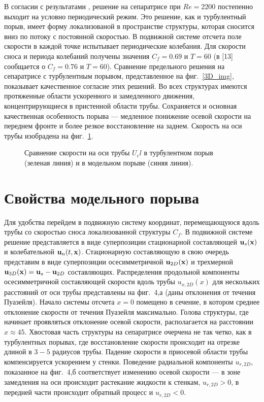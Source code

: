 В согласии с результатами \cite{Avila2013}, решение на сепаратрисе при $Re=2200$ постепенно выходит на условно периодический режим. Это решение, как и турбулентный порыв, имеет форму локализованой в пространстве структуры, которая сносится вниз по потоку с постоянной скоростью. В подвижной системе отсчета поле скорости в каждой точке испытывает периодические колебания. Для скорости сноса и периода колебаний получены значения $C_f=0.69$ и $T=60$ (в [13] сообщается о $C_f=0.76$ и $T=60$). Сравнение предельного решения на сепаратрисе с турбулентным порывом, представленное на фиг.~\ref{3D_img}, показывает качественное согласие этих решений. Во всех структурах имеются протяженные области ускоренного и замедленного движения, концентрирующиеся в пристенной области трубы. Сохраняется и основная качественная особенность порыва --- медленное понижение осевой скорости на переднем фронте и более резкое восстановление на заднем. Скорость на оси трубы изобрадена на фиг.~\ref{ucl_cmp_img}. 

\begin{figure}[h]
\caption{Сравнение скорости на оси трубы $U_cl$ в турбулентном порыв (зеленая линия) и в модельном порыве (синяя линия).}
\label{ucl_cmp_img}
\end{figure}

\section{Свойства модельного порыва}

Для удобства перейдем в подвижную систему координат, перемещающуюся вдоль трубы со скоростью сноса локализованной структуры $C_f$. В подвижной системе решение представляется в виде суперпозиции стационарной составляющей $\mathbf{u}_s(\mathbf{x})$ и колебательной $\mathbf{u}_n(t,\mathbf{x})$. Стационарную составляющую в свою очередь представим в виде суперпозиции осесимметричной $\mathbf{u}_{2D}(\mathbf{x})$ и трехмерной $\mathbf{u}_{3D}(\mathbf{x})=\mathbf{u}_s-\mathbf{u}_{2D}$ составляющих. Распределения продольной компоненты осесимметричной составляющей скорости вдоль трубы $u_{x,2D}(x)$ для нескольких расстояний от оси трубы представлены на фиг.~4,а (даны отклонения от течения Пуазейля). Начало системы отсчета $x=0$ помещено в сечение, в котором среднее отклонение скорости от течения Пуазейля максимально. Голова структуры, где начинает проявляться отклонение осевой скорости, располагается на расстоянии $x\approx45$. Хвостовая часть структуры на сепаратрисе очерчена не так четко, как в турбулентных порывах, где восстановление скорости происходит на отрезке длиной в $3-5$ радиусов трубы.  Падение скорости в приосевой области трубы компенсируется ускорением у стенки. Поведение радиальной компоненты $u_{r,2D}$, показанное на фиг.~4,б соответствует изменению осевой скорости --- в зоне замедления на оси происходит растекание жидкости к стенкам, $u_{r,2D}>0$, в передней части происходит обратный процесс и $u_{r,2D}<0$.

